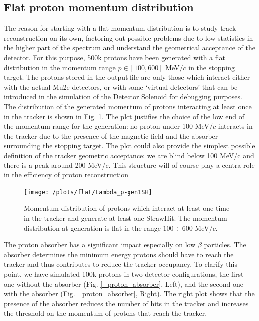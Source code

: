 \documentclass[12pt,a4paper,openright, oneside, titlepage]{book} %
\begin{document}
\subsection{Flat proton momentum distribution}
The reason for starting with a flat momentum distribution is to study track reconstruction on its own, factoring out possible problems due to low statistics in the higher part of the spectrum and understand the geometrical acceptance of the detector. 
For this purpose, 500k protons have been generated with a flat distribution in the momentum range $p\in[100,600]$ MeV$/c$ in the stopping target. 
The protons stored in the output file are only those which interact either with the actual Mu2e detectors, or with some `virtual detectors' that can be introduced in the simulation of the Detector Solenoid for debugging purposes.\\
The distribution of the generated momentum of protons interacting at least once in the tracker is shown in Fig. \ref{_flat_Lambda_p-gen1SH}. 
The plot justifies the choice of the low end of the momentum range for the generation: no proton under 100 MeV$/c$ interacts in the tracker due to the presence of the magnetic field and the absorber surrounding the stopping target. 
The plot could also provide the simplest possible definition of the tracker geometric acceptance:
we are blind below 100 MeV/c and there is a peak around 200 MeV/c. This structure will of course play a centra role in the efficiency of proton reconstruction. \\

\begin{figure}[!htb]
\centering
\texttt{[image: /plots/flat/Lambda\_p-gen1SH]}
\caption[Momentum distribution for particles interacting in the tracker]{Momentum distribution of protons which interact 
at least one time in the tracker and generate at least one StrawHit. 
The momentum distribution at generation is flat in the range $100 \div 600$ MeV$/c$.}
\label{_flat_Lambda_p-gen1SH}
\end{figure}

\noindent 
The proton absorber has a significant impact especially on low $\beta$ particles. 
The absorber determines the minimum energy protons should have to reach the tracker
and thus contributes to reduce the tracker occupancy.
To clarify this point, we have simulated 100k protons in two detector configurations, the first one without the absorber  (Fig. \ref{_proton_absorber}, Left), and the second one with the absorber (Fig.\ref{_proton_absorber}, Right). 
The right plot shows that the presence of the absorber reduces the number of hits in the tracker and increases the threshold on the momentum of protons that reach the tracker.
\end{document}
